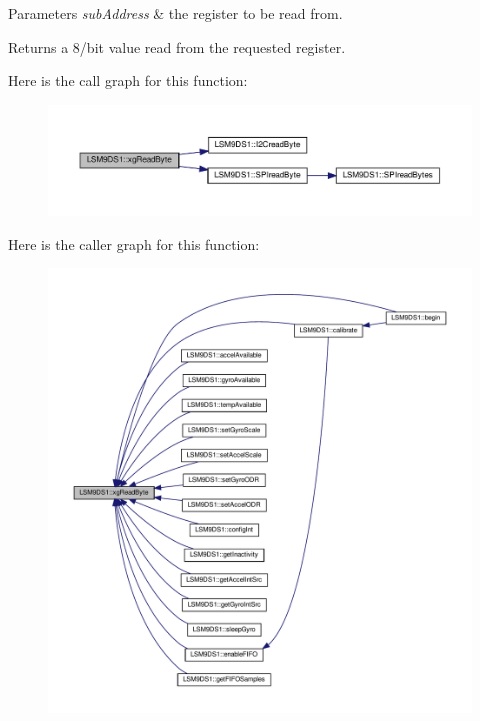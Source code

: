 \begin{DoxyParams}{Parameters}
{\em sub\+Address} & the register to be read from. \\
\hline
\end{DoxyParams}
\begin{DoxyReturn}{Returns}
a 8/bit value read from the requested register. 
\end{DoxyReturn}
Here is the call graph for this function\+:\nopagebreak
\begin{figure}[H]
\begin{center}
\leavevmode
\includegraphics[width=350pt]{classLSM9DS1_af7f9789df6f0178764c815a3380c202a_cgraph}
\end{center}
\end{figure}
Here is the caller graph for this function\+:\nopagebreak
\begin{figure}[H]
\begin{center}
\leavevmode
\includegraphics[width=350pt]{classLSM9DS1_af7f9789df6f0178764c815a3380c202a_icgraph}
\end{center}
\end{figure}
\mbox{\label{classLSM9DS1_ae0a9cbfd74b1f4676f091c2d8e491d77}} 

